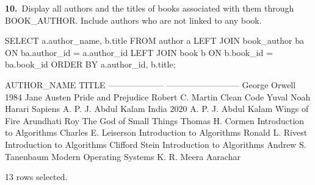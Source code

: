 \noindent\begin{minipage}{\linewidth}
\begingroup{}
{\fontsize{14}{17}\selectfont\textbf{10.}}\ Display all authors and the titles of books associated with them through BOOK\_AUTHOR. Include authors who are not linked to any book.\par
\endgroup\vspace{12pt}


\begin{sqlcode}
SELECT a.author_name, b.title
FROM author a
LEFT JOIN book_author ba ON ba.author_id = a.author_id
LEFT JOIN book b ON b.book_id = ba.book_id
ORDER BY a.author_id, b.title;
\end{sqlcode}

\vspace{18pt}


\begin{sqlout}[fontsize=\small]
AUTHOR_NAME           TITLE                     
--------------------  --------------------------
George Orwell         1984
Jane Austen           Pride and Prejudice
Robert C. Martin      Clean Code
Yuval Noah Harari     Sapiens
A. P. J. Abdul Kalam  India 2020
A. P. J. Abdul Kalam  Wings of Fire
Arundhati Roy         The God of Small Things
Thomas H. Cormen      Introduction to Algorithms
Charles E. Leiserson  Introduction to Algorithms
Ronald L. Rivest      Introduction to Algorithms
Clifford Stein        Introduction to Algorithms
Andrew S. Tanenbaum   Modern Operating Systems
K. R. Meera           Aarachar

13 rows selected.
\end{sqlout}
\end{minipage}\par\vspace{24pt}

